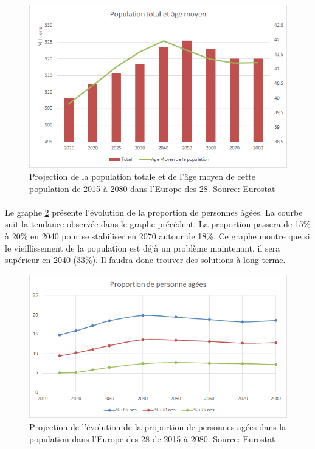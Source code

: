 \begin{figure}[h!]
    \begin{center}
        \includegraphics[scale=0.7]{document/proj_pop.png}
        \caption{Projection de la population totale et de l'âge moyen de cette population de 2015 à 2080 dans l'Europe des 28. Source: Eurostat~\citep{eurostat_europop13}}
        \label{proj_pop}
    \end{center}
\end{figure}

\paragraph{}Le graphe \ref{proj_prop} présente l’évolution de la proportion de personnes âgées. La courbe suit la tendance observée dans le graphe précédent. La proportion passera de 15\% à 20\% en 2040 pour se stabiliser en 2070 autour de 18\%. Ce graphe montre que si le vieillissement de la population est déjà un problème maintenant, il sera supérieur en 2040 (33\%). Il faudra donc trouver des solutions à long terme.

\begin{figure}[h!]
    \begin{center}
        \includegraphics[scale=0.7]{document/proj_prop.png}
        \caption{Projection de l'évolution de la proportion de personnes agées dans la population dans l'Europe des 28 de 2015 à 2080. Source: Eurostat~\citep{eurostat_europop13}}
        \label{proj_prop}
    \end{center}
\end{figure}

